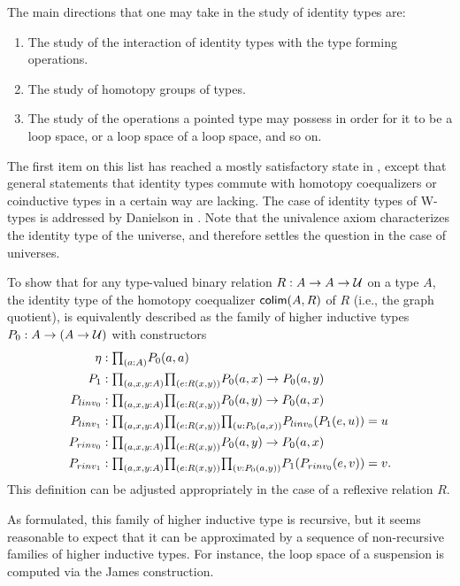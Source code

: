 \documentclass[reqno]{amsart}
\begin{document}
The main directions that one may take in the study of identity types are:
\begin{enumerate}
\item The study of the interaction of identity types with the type forming operations.
\item The study of homotopy groups of types.
\item The study of the operations a pointed type may possess in order for it to be a loop space, or a loop space of a loop space, and so on.
\end{enumerate}
The first item on this list has reached a mostly satisfactory state in \cite{hottbook}, except that general statements that identity types commute with homotopy coequalizers or coinductive types in a certain way are lacking. The case of identity types of W-types is addressed by Danielson in \cite{Danielson12Blog}. Note that the univalence axiom characterizes the identity type of the universe, and therefore settles the question in the case of universes.

\begin{proposal}\label{p:id_of_coeq}
To show that for any type-valued binary relation $R:A\to A\to \mathcal{U}$ on a type $A$, the identity type of the homotopy coequalizer 
$\mathsf{colim}(A,R)$ of $R$ (i.e., the graph quotient), is equivalently described as
the family of higher inductive types $\pts{P}:A\to (A\to\UU)$ with constructors
\begin{align*}
\eta & : \prd{a:A} \pts{P}(a,a) \\
\edg{P} & : \prd*{a,x,y:A}{e:R(x,y)} \pts{P}(a,x)\to\pts{P}(a,y) \\
{P}_{linv_0} & : \prd*{a,x,y:A}{e:R(x,y)} \pts{P}(a,y)\to\pts{P}(a,x) \\
{P}_{linv_1} & : \prd*{a,x,y:A}{e:R(x,y)}{u:\pts{P}(a,x)} P_{linv_0}(\edg{P}(e,u))=u \\
{P}_{rinv_0} & : \prd*{a,x,y:A}{e:R(x,y)} \pts{P}(a,y)\to\pts{P}(a,x) \\
{P}_{rinv_1} & : \prd*{a,x,y:A}{e:R(x,y)}{v:\pts{P}(a,y)} \edg{P}({P}_{rinv_0}(e,v))=v.
\end{align*}
This definition can be adjusted appropriately in the case of a reflexive relation $R$. 

As formulated, this family of higher inductive type is recursive, but it seems
reasonable to expect that it can be approximated by a sequence of non-recursive
families of higher inductive types. For instance, the loop space of a suspension
is computed via the James construction. 
\end{proposal}
\end{document}
